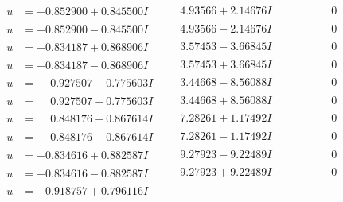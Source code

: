 \documentclass[1p]{elsarticle_modified}
\theoremstyle{definition}
\begin{document}
$$\begin{array}{c|c|c}
 \hline 
\begin{aligned}
u &= -0.852900 + 0.845500 I\end{aligned}
 & \phantom{-}4.93566 + 2.14676 I & \phantom{-0.000000 } 0 \\ \hline\begin{aligned}
u &= -0.852900 - 0.845500 I\end{aligned}
 & \phantom{-}4.93566 - 2.14676 I & \phantom{-0.000000 } 0 \\ \hline\begin{aligned}
u &= -0.834187 + 0.868906 I\end{aligned}
 & \phantom{-}3.57453 - 3.66845 I & \phantom{-0.000000 } 0 \\ \hline\begin{aligned}
u &= -0.834187 - 0.868906 I\end{aligned}
 & \phantom{-}3.57453 + 3.66845 I & \phantom{-0.000000 } 0 \\ \hline\begin{aligned}
u &= \phantom{-}0.927507 + 0.775603 I\end{aligned}
 & \phantom{-}3.44668 - 8.56088 I & \phantom{-0.000000 } 0 \\ \hline\begin{aligned}
u &= \phantom{-}0.927507 - 0.775603 I\end{aligned}
 & \phantom{-}3.44668 + 8.56088 I & \phantom{-0.000000 } 0 \\ \hline\begin{aligned}
u &= \phantom{-}0.848176 + 0.867614 I\end{aligned}
 & \phantom{-}7.28261 + 1.17492 I & \phantom{-0.000000 } 0 \\ \hline\begin{aligned}
u &= \phantom{-}0.848176 - 0.867614 I\end{aligned}
 & \phantom{-}7.28261 - 1.17492 I & \phantom{-0.000000 } 0 \\ \hline\begin{aligned}
u &= -0.834616 + 0.882587 I\end{aligned}
 & \phantom{-}9.27923 - 9.22489 I & \phantom{-0.000000 } 0 \\ \hline\begin{aligned}
u &= -0.834616 - 0.882587 I\end{aligned}
 & \phantom{-}9.27923 + 9.22489 I & \phantom{-0.000000 } 0 \\ \hline\begin{aligned}
u &= -0.918757 + 0.796116 I\end{aligned}

\end{array}$$
\end{document}
